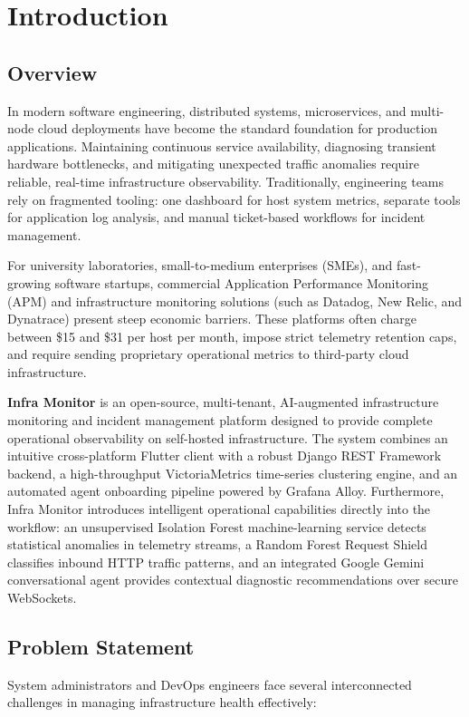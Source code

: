 \chapter{Introduction}

\section{Overview}
In modern software engineering, distributed systems, microservices, and multi-node cloud deployments have become the standard foundation for production applications. Maintaining continuous service availability, diagnosing transient hardware bottlenecks, and mitigating unexpected traffic anomalies require reliable, real-time infrastructure observability. Traditionally, engineering teams rely on fragmented tooling: one dashboard for host system metrics, separate tools for application log analysis, and manual ticket-based workflows for incident management.

For university laboratories, small-to-medium enterprises (SMEs), and fast-growing software startups, commercial Application Performance Monitoring (APM) and infrastructure monitoring solutions (such as Datadog, New Relic, and Dynatrace) present steep economic barriers. These platforms often charge between \$15 and \$31 per host per month, impose strict telemetry retention caps, and require sending proprietary operational metrics to third-party cloud infrastructure.

\textbf{Infra Monitor} is an open-source, multi-tenant, AI-augmented infrastructure monitoring and incident management platform designed to provide complete operational observability on self-hosted infrastructure. The system combines an intuitive cross-platform Flutter client with a robust Django REST Framework backend, a high-throughput VictoriaMetrics time-series clustering engine, and an automated agent onboarding pipeline powered by Grafana Alloy. Furthermore, Infra Monitor introduces intelligent operational capabilities directly into the workflow: an unsupervised Isolation Forest machine-learning service detects statistical anomalies in telemetry streams, a Random Forest Request Shield classifies inbound HTTP traffic patterns, and an integrated Google Gemini conversational agent provides contextual diagnostic recommendations over secure WebSockets.

\section{Problem Statement}
System administrators and DevOps engineers face several interconnected challenges in managing infrastructure health effectively:

